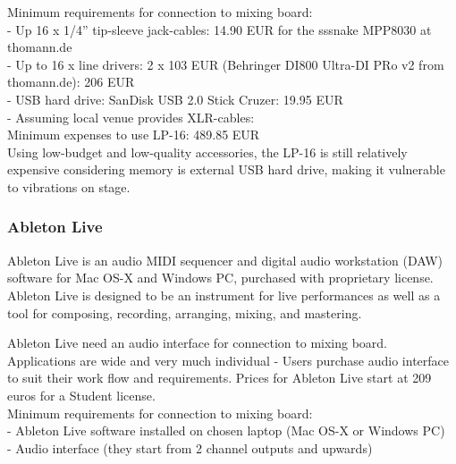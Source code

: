 Minimum requirements for connection to mixing board: \\

- Up 16 x 1/4'' tip-sleeve jack-cables: 14.90 EUR for the sssnake MPP8030 at thomann.de \\
- Up to 16 x line drivers: 2 x 103 EUR (Behringer DI800 Ultra-DI PRo v2 from thomann.de): 206 EUR \\
- USB hard drive: SanDisk USB 2.0 Stick Cruzer: 19.95 EUR \\
- Assuming local venue provides XLR-cables: \\
	Minimum expenses to use LP-16: 489.85 EUR \\

Using low-budget and low-quality accessories, the LP-16 is still relatively expensive considering memory is external USB hard drive, making it vulnerable to vibrations on stage.

\subsubsection{Ableton Live}
Ableton Live is an audio MIDI sequencer and digital audio workstation (DAW) software for Mac OS-X and Windows PC, purchased with proprietary license. Ableton Live is designed to be an instrument for live performances as well as a tool for composing, recording, arranging, mixing, and mastering. \newline

Ableton Live need an audio interface for connection to mixing board. Applications are wide and very much individual - Users purchase audio interface to suit their work flow and requirements.  Prices for Ableton Live start at 209 euros for a Student license.\\

Minimum requirements for connection to mixing board: \\

- Ableton Live software installed on chosen laptop (Mac OS-X or Windows PC) \\
- Audio interface (they start from 2 channel outputs and upwards) \\

